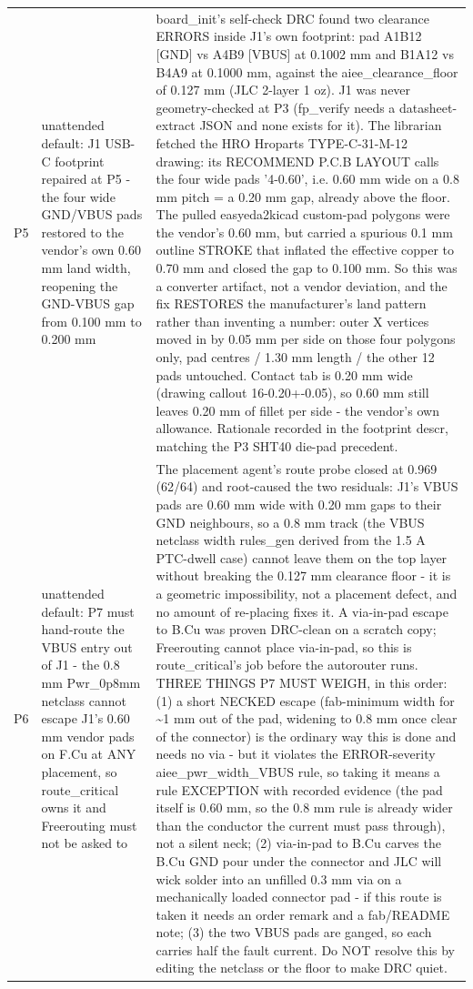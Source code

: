 \documentclass[11pt,a4paper]{article}
\begin{document}
{\begin{longtable}{lp{5.2cm}p{7.2cm}}
P5 & unattended default: J1 USB-C footprint repaired at P5 - the four wide GND/VBUS pads restored to the vendor's own 0.60 mm land width, reopening the GND-VBUS gap from 0.100 mm to 0.200 mm & board\_init's self-check DRC found two clearance ERRORS inside J1's own footprint: pad A1B12 {[}GND{]} vs A4B9 {[}VBUS{]} at 0.1002 mm and B1A12 vs B4A9 at 0.1000 mm, against the aiee\_clearance\_floor of 0.127 mm (JLC 2-layer 1 oz). J1 was never geometry-checked at P3 (fp\_verify needs a datasheet-extract JSON and none exists for it). The librarian fetched the HRO Hroparts TYPE-C-31-M-12 drawing: its RECOMMEND P.C.B LAYOUT calls the four wide pads '4-0.60', i.e. 0.60 mm wide on a 0.8 mm pitch = a 0.20 mm gap, already above the floor. The pulled easyeda2kicad custom-pad polygons were the vendor's 0.60 mm, but carried a spurious 0.1 mm outline STROKE that inflated the effective copper to 0.70 mm and closed the gap to 0.100 mm. So this was a converter artifact, not a vendor deviation, and the fix RESTORES the manufacturer's land pattern rather than inventing a number: outer X vertices moved in by 0.05 mm per side on those four polygons only, pad centres / 1.30 mm length / the other 12 pads untouched. Contact tab is 0.20 mm wide (drawing callout 16-0.20+-0.05), so 0.60 mm still leaves 0.20 mm of fillet per side - the vendor's own allowance. Rationale recorded in the footprint descr, matching the P3 SHT40 die-pad precedent. \\
P6 & unattended default: P7 must hand-route the VBUS entry out of J1 - the 0.8 mm Pwr\_0p8mm netclass cannot escape J1's 0.60 mm vendor pads on F.Cu at ANY placement, so route\_critical owns it and Freerouting must not be asked to & The placement agent's route probe closed at 0.969 (62/64) and root-caused the two residuals: J1's VBUS pads are 0.60 mm wide with 0.20 mm gaps to their GND neighbours, so a 0.8 mm track (the VBUS netclass width rules\_gen derived from the 1.5 A PTC-dwell case) cannot leave them on the top layer without breaking the 0.127 mm clearance floor - it is a geometric impossibility, not a placement defect, and no amount of re-placing fixes it. A via-in-pad escape to B.Cu was proven DRC-clean on a scratch copy; Freerouting cannot place via-in-pad, so this is route\_critical's job before the autorouter runs. THREE THINGS P7 MUST WEIGH, in this order: (1) a short NECKED escape (fab-minimum width for \textasciitilde{}1 mm out of the pad, widening to 0.8 mm once clear of the connector) is the ordinary way this is done and needs no via - but it violates the ERROR-severity aiee\_pwr\_width\_VBUS rule, so taking it means a rule EXCEPTION with recorded evidence (the pad itself is 0.60 mm, so the 0.8 mm rule is already wider than the conductor the current must pass through), not a silent neck; (2) via-in-pad to B.Cu carves the B.Cu GND pour under the connector and JLC will wick solder into an unfilled 0.3 mm via on a mechanically loaded connector pad - if this route is taken it needs an order remark and a fab/README note; (3) the two VBUS pads are ganged, so each carries half the fault current. Do NOT resolve this by editing the netclass or the floor to make DRC quiet. \\

\end{longtable}}
\end{document}
